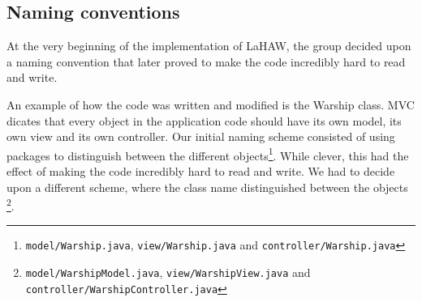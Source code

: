 \subsection{Naming conventions}
At the very beginning of the implementation of LaHAW, the group decided upon a naming convention that later proved to make the code incredibly hard to read and write.

An example of how the code was written and modified is the Warship class. MVC dicates that every object in the application code should have its own model, its own view and its own controller. Our initial naming scheme consisted of using packages to distinguish between the different objects{\footnote{\texttt{model/Warship.java}, \texttt{view/Warship.java} and \texttt{controller/Warship.java}}}. While clever, this had the effect of making the code incredibly hard to read and write. %
We had to decide upon a different scheme, where the class name distinguished between the objects \footnote{\texttt{model/WarshipModel.java}, \texttt{view/WarshipView.java} and \texttt{controller/WarshipController.java}}.
